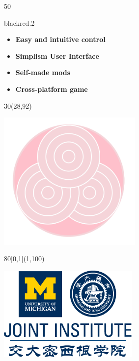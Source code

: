 \documentclass[hyperref={pdfpagelabels=false}]{beamer}
\begin{document}
\begin{frame}
\begin{textblock}{50}
\begin{transparentbox}{black}{red}{.2}
\begin{itemize}\itemsep .85cm
				\item \textbf{Easy and intuitive control} 

				\item \textbf{Simplism User Interface}

				\item  \textbf{Self-made mods} 

				\item  \textbf{Cross-platform game} 
\end{itemize}       	 



		\end{transparentbox}
	\end{textblock} 






	\begin{textblock}{30}(28,92)
		\begin{blankbox}
			\includegraphics[width=200pt]{img/Teamlogo.png}

		\end{blankbox}
	\end{textblock}


	\begin{textblock}{80}[0,1](1,100)
		 
			\includegraphics[width=195pt]{img/JI-dark.pdf}
	\end{textblock}


\end{frame}
\end{document}
